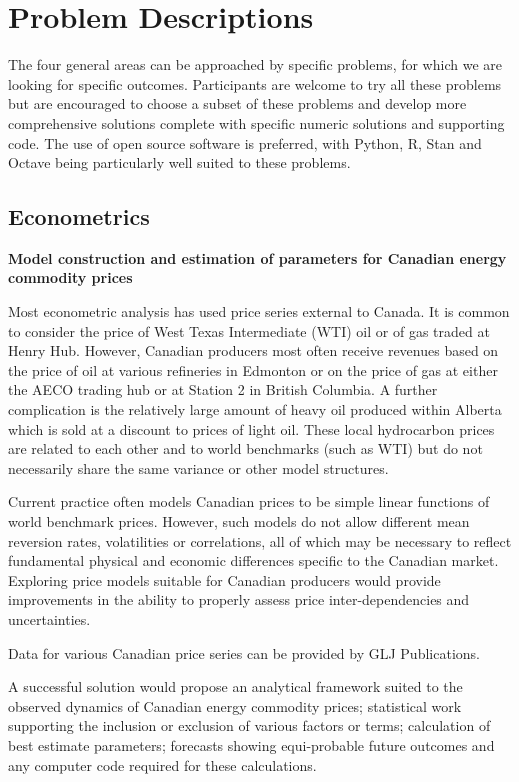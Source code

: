 \documentclass[12pt,a4paper]{article}
\begin{document}
\section{Problem Descriptions}

The four general areas can be approached by specific problems, for which we are looking for specific outcomes.  Participants are welcome to try all these problems but are encouraged to choose a subset of these problems and develop more comprehensive solutions complete with specific numeric solutions and supporting code.  The use of open source software is preferred, with Python, R, Stan and Octave being particularly well suited to these problems.


\subsection{Econometrics}

{\bf Model construction and estimation of parameters for Canadian energy commodity prices }

Most econometric analysis has used price series external to Canada. It is common to consider the price of West Texas Intermediate (WTI) oil or of gas traded at Henry Hub. However, Canadian producers most often receive revenues based on the price of oil at various refineries in Edmonton or on the price of gas at either the AECO trading hub or at Station 2 in British Columbia. A further complication is the relatively large amount of heavy oil produced within Alberta which is sold at a discount to prices of light oil. These local hydrocarbon prices are related to each other and to world benchmarks (such as WTI) but do not necessarily share the same variance or other model structures.

Current practice often models Canadian prices to be simple linear functions of world benchmark prices. However, such models do not allow different mean reversion rates, volatilities or correlations, all of which may be necessary to reflect fundamental physical and economic differences specific to the Canadian market. Exploring price models suitable for Canadian producers would provide improvements in the ability to properly assess price inter-dependencies and uncertainties.

Data for various Canadian price series can be provided by GLJ Publications.

A successful solution would propose an analytical framework suited to the observed dynamics of Canadian energy commodity prices; statistical work supporting the inclusion or exclusion of various factors or terms; calculation of best estimate parameters; forecasts showing equi-probable future outcomes and any computer code required for these calculations.
\end{document}
